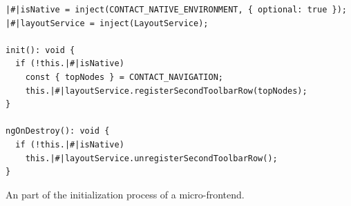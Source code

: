 \ifshowListings
\begin{listing}[H]
  \begin{verbatim}
|#|isNative = inject(CONTACT_NATIVE_ENVIRONMENT, { optional: true });
|#|layoutService = inject(LayoutService);

init(): void {
  if (!this.|#|isNative)
    const { topNodes } = CONTACT_NAVIGATION;
    this.|#|layoutService.registerSecondToolbarRow(topNodes);
}

ngOnDestroy(): void {
  if (!this.|#|isNative)
    this.|#|layoutService.unregisterSecondToolbarRow();
}
  \end{verbatim}
  \caption{An part of the initialization process of a micro-frontend.}\label{code:applied-methods:communication-patterns:initialization-logic-micro-frontend}
\end{listing}
\fi


